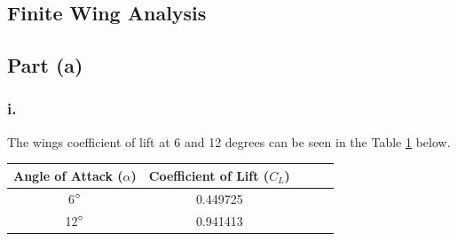\begin{singlespace}
\section{Finite Wing Analysis}
\subsection{Part (a)}
\subsubsection{i.}
The wings coefficient of lift at 6 and 12 degrees can be seen in the Table \ref{table:2ai} below.

    \begin{table}[H]
    \centering
        \begin{tabular}{|c|c|c|c|c|} %
            \hline \textbf{Angle of Attack ($\alpha$)} & \textbf{Coefficient of Lift ($C_L$)} \\ \hline %
            6$\degree$ & 0.449725 \\ \hline
           12$\degree$ & 0.941413 \\ \hline
        \end{tabular}
        \label{table:2ai}
    \end{table}

    

\end{singlespace}
